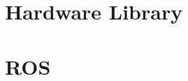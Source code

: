 
\appendix

\chapter{Hardware Library}\label{hardwarelib}

\lstset{language=Python}


\chapter{ROS}
